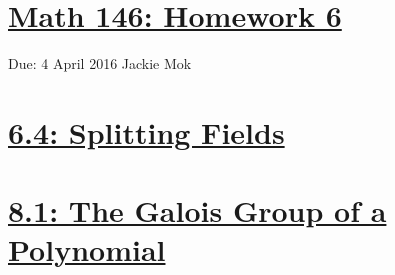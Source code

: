 \documentclass{article}
\begin{document}
\section*{\underline{Math 146: Homework 6}}
Due: 4 April 2016
\newline Jackie Mok

\vspace{10 mm}
\section*{\underline{6.4: Splitting Fields}}






\section*{\underline{8.1: The Galois Group of a Polynomial}}



\end{document}
